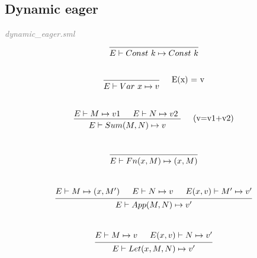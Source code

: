 \documentclass[a4paper]{article}
\begin{document}
	\subsection{Dynamic eager}
	\textit{\textcolor{gray}{dynamic\_eager.sml}} \\

	\[
		\begin{prooftree}
			\hypo{}
			\infer1[]{E \vdash Const \ k \mapsto Const \ k}
		\end{prooftree}
	\]
	\\
	\[
		\begin{prooftree}
			\hypo{}
			\infer1[\quad E(x) = v]{E \vdash Var \ x \mapsto v}
		\end{prooftree}
	\]
	\\
	\[
		\begin{prooftree}
			\hypo{E \vdash M \mapsto v1}
			\hypo{E \vdash N \mapsto v2 }
			\infer2[\quad (v=v1+v2)]{E \vdash Sum(M, N) \mapsto v}
		\end{prooftree}
	\]
	\\
	\[
		\begin{prooftree}
			\hypo{}
			\infer1[]{E \vdash Fn(x, M) \mapsto (x, M)}
		\end{prooftree}
	\]
	\\
	\[
		\begin{prooftree}
			\hypo{E \vdash M \mapsto (x, M')}
			\hypo{E \vdash N \mapsto v}
			\hypo{E(x, v) \vdash M' \mapsto v'}
			\infer3[]{E \vdash App(M, N) \mapsto v'}
		\end{prooftree}
	\]
	\\
	\[
		\begin{prooftree}
			\hypo{E \vdash M \mapsto v}
			\hypo{E(x, v) \vdash N \mapsto v'}
			\infer2[]{E \vdash Let(x, M, N) \mapsto v' }
		\end{prooftree}
	\]
\end{document}
